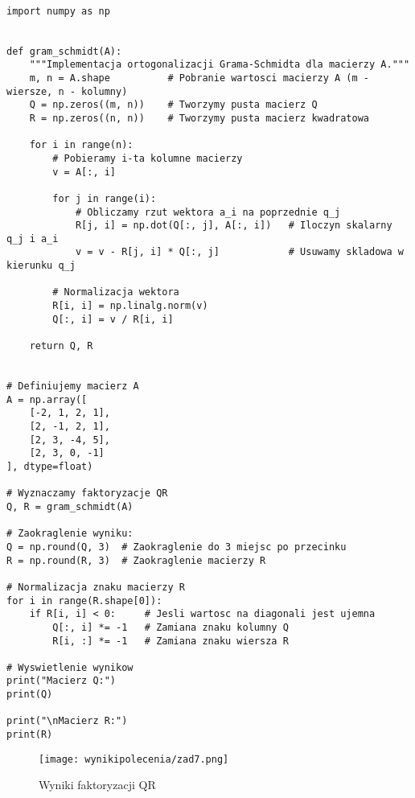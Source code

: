 \documentclass{article}
\begin{document}
\begin{lstlisting}

import numpy as np


def gram_schmidt(A):
    """Implementacja ortogonalizacji Grama-Schmidta dla macierzy A."""
    m, n = A.shape          # Pobranie wartosci macierzy A (m - wiersze, n - kolumny)
    Q = np.zeros((m, n))    # Tworzymy pusta macierz Q
    R = np.zeros((n, n))    # Tworzymy pusta macierz kwadratowa

    for i in range(n):
        # Pobieramy i-ta kolumne macierzy
        v = A[:, i]

        for j in range(i):
            # Obliczamy rzut wektora a_i na poprzednie q_j
            R[j, i] = np.dot(Q[:, j], A[:, i])   # Iloczyn skalarny q_j i a_i
            v = v - R[j, i] * Q[:, j]            # Usuwamy skladowa w kierunku q_j

        # Normalizacja wektora
        R[i, i] = np.linalg.norm(v)
        Q[:, i] = v / R[i, i]

    return Q, R


# Definiujemy macierz A
A = np.array([
    [-2, 1, 2, 1],
    [2, -1, 2, 1],
    [2, 3, -4, 5],
    [2, 3, 0, -1]
], dtype=float)

# Wyznaczamy faktoryzacje QR
Q, R = gram_schmidt(A)

# Zaokraglenie wyniku:
Q = np.round(Q, 3)  # Zaokraglenie do 3 miejsc po przecinku
R = np.round(R, 3)  # Zaokraglenie macierzy R

# Normalizacja znaku macierzy R
for i in range(R.shape[0]):
    if R[i, i] < 0:     # Jesli wartosc na diagonali jest ujemna
        Q[:, i] *= -1   # Zamiana znaku kolumny Q
        R[i, :] *= -1   # Zamiana znaku wiersza R

# Wyswietlenie wynikow
print("Macierz Q:")
print(Q)

print("\nMacierz R:")
print(R)

\end{lstlisting}

\begin{figure}[h]
    \centering
    \texttt{[image: wynikipolecenia/zad7.png]}
    \caption{Wyniki faktoryzacji QR}
    \label{zad8wyniki}
\end{figure}
\end{document}
